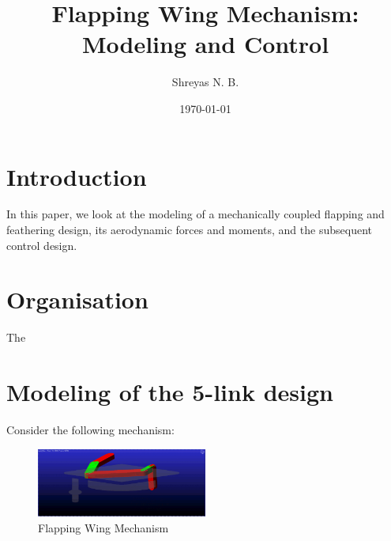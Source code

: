 \documentclass{article}
\begin{document}
\title{Flapping Wing Mechanism: Modeling and Control}
\author{Shreyas N. B.}
\date{\today}
\maketitle

\section{Introduction}
In this paper, we look at the modeling of a mechanically coupled flapping and feathering design, its aerodynamic forces and moments, and the subsequent control design.

\section{Organisation}
The 


\section{Modeling of the 5-link design}

Consider the following mechanism:

\begin{figure}
\centering
\includegraphics[width=0.5\textwidth]{Figures/links.png}
\caption{Flapping Wing Mechanism}
\end{figure}
\end{document}
